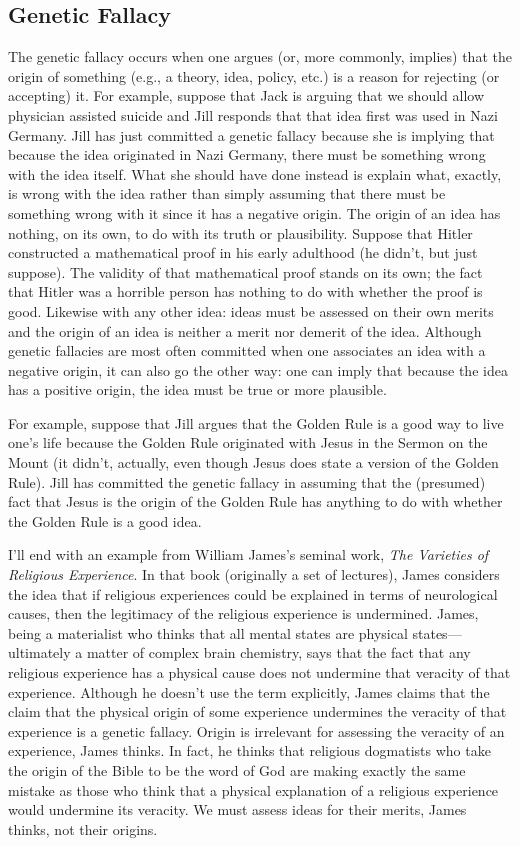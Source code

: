\subsection{Genetic Fallacy}
The genetic fallacy occurs when one argues (or, more commonly, implies) that the origin of something (e.g., a theory, idea, policy, etc.) is a reason for rejecting (or accepting) it. For example, suppose that Jack is arguing that we should allow physician assisted suicide and Jill responds that that idea first was used in Nazi Germany. Jill has just committed a genetic fallacy because she is implying that because the idea originated in Nazi Germany, there must be something wrong with the idea itself. What she should have done instead is explain what, exactly, is wrong with the idea rather than simply assuming that there must be something wrong with it since it has a negative origin. The origin of an idea has nothing, on its own, to do with its truth or plausibility. Suppose that Hitler constructed a mathematical proof in his early adulthood (he didn't, but just suppose). The validity of that mathematical proof stands on its own; the fact that Hitler was a horrible person has nothing to do with whether the proof is good. Likewise with any other idea: ideas must be assessed on their own merits and the origin of an idea is neither a merit nor demerit of the idea. Although genetic fallacies are most often committed when one associates an idea with a negative origin, it can also go the other way: one can imply that because the idea has a positive origin, the idea must be true or more plausible.

For example, suppose that Jill argues that the Golden Rule is a good way to live one's life because the Golden Rule originated with Jesus in the Sermon on the Mount (it didn't, actually, even though Jesus does state a version of the Golden Rule). Jill has committed the genetic fallacy in assuming that the (presumed) fact that Jesus is the origin of the Golden Rule has anything to do with whether the Golden Rule is a good idea.

I'll end with an example from William James's seminal work, \textit{The Varieties of Religious Experience}. In that book (originally a set of lectures), James considers the idea that if religious experiences could be explained in terms of neurological causes, then the legitimacy of the religious experience is undermined. James, being a materialist who thinks that all mental states are physical states---ultimately a matter of complex brain chemistry, says that the fact that any religious experience has a physical cause does not undermine that veracity of that experience. Although he doesn't use the term explicitly, James claims that the claim that the physical origin of some experience undermines the veracity of that experience is a genetic fallacy. Origin is irrelevant for assessing the veracity of an experience, James thinks. In fact, he thinks that religious dogmatists who take the origin of the Bible to be the word of God are making exactly the same mistake as those who think that a physical explanation of a religious experience would undermine its veracity. We must assess ideas for their merits, James thinks, not their origins.

